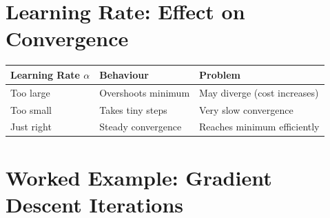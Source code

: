 \documentclass[12pt,a4paper]{report}
\begin{document}
\section{Learning Rate: Effect on Convergence}

\begin{center}
\begin{tabular}{lll}
\toprule
\textbf{Learning Rate $\alpha$} & \textbf{Behaviour} & \textbf{Problem} \\
\midrule
Too large & Overshoots minimum & May diverge (cost increases) \\
Too small & Takes tiny steps & Very slow convergence \\
Just right & Steady convergence & Reaches minimum efficiently \\
\bottomrule
\end{tabular}
\end{center}

\section{Worked Example: Gradient Descent Iterations}
\end{document}

